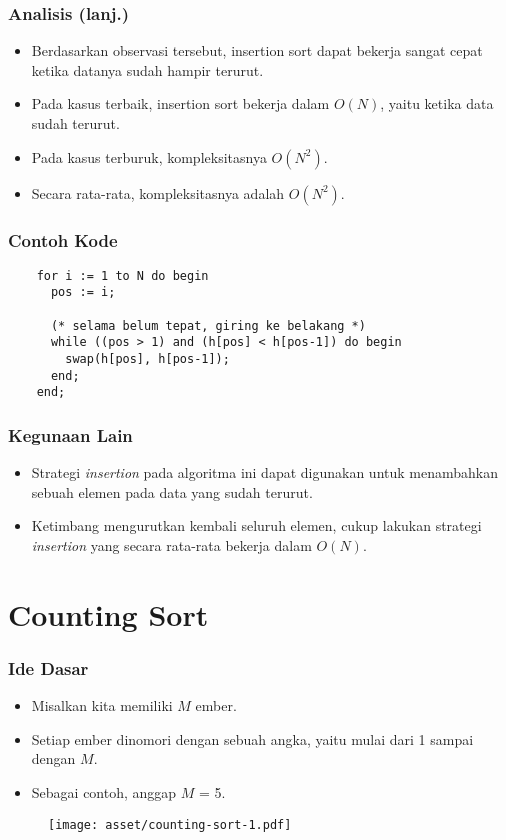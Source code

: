 \begin{frame}
\frametitle{Analisis (lanj.)}
  \begin{itemize}
    \item Berdasarkan observasi tersebut, insertion sort dapat bekerja
    sangat cepat ketika datanya sudah hampir terurut.
    \item Pada kasus terbaik, insertion sort bekerja dalam $O(N)$, yaitu
    ketika data sudah terurut.
    \item Pada kasus terburuk, kompleksitasnya $O(N^2)$.
    \item Secara rata-rata, kompleksitasnya adalah $O(N^2)$.
  \end{itemize}
\end{frame}

\begin{frame}[fragile]
\frametitle{Contoh Kode}
  \begin{lstlisting}
    for i := 1 to N do begin
      pos := i;
      
      (* selama belum tepat, giring ke belakang *)
      while ((pos > 1) and (h[pos] < h[pos-1]) do begin
        swap(h[pos], h[pos-1]);
      end;
    end;
  \end{lstlisting}
\end{frame}

\begin{frame}
\frametitle{Kegunaan Lain}
  \begin{itemize}
    \item Strategi \textit{insertion} pada algoritma ini dapat digunakan untuk menambahkan sebuah elemen pada data yang sudah terurut.
    \item Ketimbang mengurutkan kembali seluruh elemen, cukup
    lakukan strategi \textit{insertion} yang secara rata-rata bekerja dalam
    $O(N)$.
  \end{itemize}
\end{frame}

\section{Counting Sort}
\frame{\sectionpage}

\begin{frame}
\frametitle{Ide Dasar}
  \begin{itemize}
    \item Misalkan kita memiliki $M$ ember.
    \item Setiap ember dinomori dengan sebuah angka, yaitu mulai dari 1 sampai dengan $M$.
    \item Sebagai contoh, anggap $M$ = 5.
  \end{itemize}  
  \begin{figure}
    \texttt{[image: asset/counting-sort-1.pdf]}
  \end{figure}
\end{frame}

